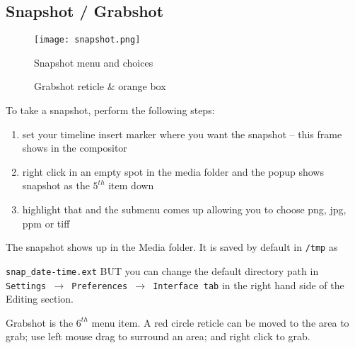 \subsection{Snapshot / Grabshot}%
\label{sub:snapshot_grabshot}

\begin{figure}[htpb]
    \centering
    \begin{minipage}{.49\linewidth}
    \centering
    \texttt{[image: snapshot.png]}
    \caption{Snapshot menu and choices}
    \label{fig:snapshot}
    \end{minipage}
    \begin{minipage}{.49\linewidth}
    \centering
    \caption{Grabshot reticle \& orange box}
    \label{fig:grabshot_recticle}
    \end{minipage}
\end{figure}

To take a snapshot, perform the following steps:

\begin{enumerate}
    \item set your timeline insert marker where you want the snapshot -- this frame shows in the compositor
    \item  right click in an empty spot in the media folder and the popup shows snapshot as the $5^{th}$ item down
    \item  highlight that and the submenu comes up allowing you to choose png, jpg, ppm or tiff
\end{enumerate}

The snapshot shows up in the Media folder.  
It is saved by default in \texttt{/tmp} as

\texttt{snap\_date-time.ext} BUT you can change the default directory path in \texttt{Settings $\rightarrow$ Preferences $\rightarrow$ Interface tab} in the right hand side of the Editing section.

Grabshot is the $6^{th}$ menu item.  
A red circle reticle can be moved to the area to grab; use left mouse drag to surround an area; and right click to grab.




